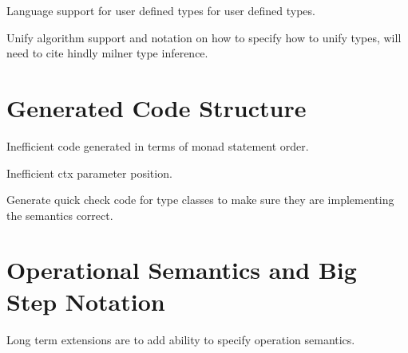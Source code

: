 Language support for user defined types for user defined types.

Unify algorithm support and notation on how to specify how to unify types, will need to cite hindly milner type inference.

\section{Generated Code Structure}
Inefficient code generated in terms of monad statement order.

Inefficient ctx parameter position.

Generate quick check code for type classes to make sure they are implementing the semantics correct.

\section{Operational Semantics and Big Step Notation}
Long term extensions are to add ability to specify operation semantics.